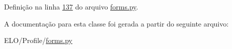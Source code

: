 Definição na linha \hyperlink{Profile_2forms_8py_source_l00137}{137} do arquivo \hyperlink{Profile_2forms_8py_source}{forms.\-py}.



A documentação para esta classe foi gerada a partir do seguinte arquivo\-:\begin{DoxyCompactItemize}
\item 
E\-L\-O/\-Profile/\hyperlink{Profile_2forms_8py}{forms.\-py}\end{DoxyCompactItemize}
